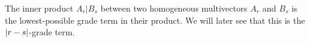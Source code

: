 \begin{definition}\label{d:inner-product1}
	The inner product $A_r|B_s$ between two homogeneous multivectors $A_r$ and $B_s$ is the lowest-possible grade term in their product. We will later see that this is the $\left|r-s\right|$-grade term.
\end{definition}
